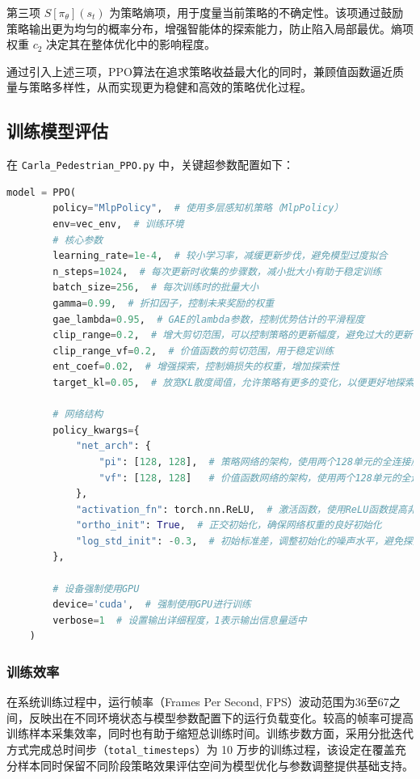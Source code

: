 第三项 $S[\pi_{\theta}](s_t)$ 为策略熵项，用于度量当前策略的不确定性。该项通过鼓励策略输出更为均匀的概率分布，增强智能体的探索能力，防止陷入局部最优。熵项权重 $c_2$ 决定其在整体优化中的影响程度。

通过引入上述三项，PPO算法在追求策略收益最大化的同时，兼顾值函数逼近质量与策略多样性，从而实现更为稳健和高效的策略优化过程。

\subsection{训练模型评估}
在 \texttt{Carla\_Pedestrian\_PPO.py} 中，关键超参数配置如下：
\begin{lstlisting}[language=Python]
model = PPO(
        policy="MlpPolicy",  # 使用多层感知机策略（MlpPolicy）
        env=vec_env,  # 训练环境
        # 核心参数
        learning_rate=1e-4,  # 较小学习率，减缓更新步伐，避免模型过度拟合
        n_steps=1024,  # 每次更新时收集的步骤数，减小批大小有助于稳定训练
        batch_size=256,  # 每次训练时的批量大小
        gamma=0.99,  # 折扣因子，控制未来奖励的权重
        gae_lambda=0.95,  # GAE的lambda参数，控制优势估计的平滑程度
        clip_range=0.2,  # 增大剪切范围，可以控制策略的更新幅度，避免过大的更新
        clip_range_vf=0.2,  # 价值函数的剪切范围，用于稳定训练
        ent_coef=0.02,  # 增强探索，控制熵损失的权重，增加探索性
        target_kl=0.05,  # 放宽KL散度阈值，允许策略有更多的变化，以便更好地探索

        # 网络结构
        policy_kwargs={
            "net_arch": {
                "pi": [128, 128],  # 策略网络的架构，使用两个128单元的全连接层
                "vf": [128, 128]   # 价值函数网络的架构，使用两个128单元的全连接层
            },
            "activation_fn": torch.nn.ReLU,  # 激活函数，使用ReLU函数提高非线性表现
            "ortho_init": True,  # 正交初始化，确保网络权重的良好初始化
            "log_std_init": -0.3,  # 初始标准差，调整初始化的噪声水平，避免探索过度
        },

        # 设备强制使用GPU
        device='cuda',  # 强制使用GPU进行训练
        verbose=1  # 设置输出详细程度，1表示输出信息量适中
    )

\end{lstlisting}

\subsubsection{训练效率}

在系统训练过程中，运行帧率（Frames Per Second, FPS）波动范围为36至67之间，反映出在不同环境状态与模型参数配置下的运行负载变化。较高的帧率可提高训练样本采集效率，同时也有助于缩短总训练时间。训练步数方面，采用分批迭代方式完成总时间步（\texttt{total\_timesteps}）为 10 万步的训练过程，该设定在覆盖充分样本同时保留不同阶段策略效果评估空间为模型优化与参数调整提供基础支持。

